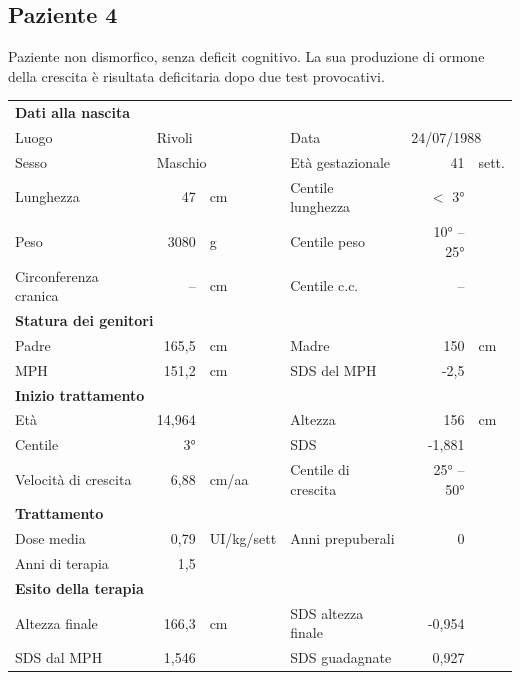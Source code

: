 \subsection*{Paziente 4}%

Paziente non dismorfico, senza deficit cognitivo. La sua produzione di ormone della crescita è risultata deficitaria dopo due test provocativi.

\begin{table}[!h]
\begin{tabular}{lrllrl}
\toprule
\multicolumn{6}{l}{\textbf{Dati alla nascita}}\\
Luogo 		& \multicolumn{2}{l}{Rivoli} 	& Data 					& \multicolumn{2}{l}{24/07/1988} 	\\
Sesso 		& \multicolumn{2}{l}{Maschio} 	& Età gestazionale 		& 41 		& sett.\\
Lunghezza 	& 47 		& cm 				& Centile lunghezza		& $<$ 3° 	\\
Peso 		& 3080 		& g					& Centile peso			& 10° -- 25° 	\\
Circonferenza cranica	& -- 		& cm 	& Centile c.c.			& -- \\
\midrule
\multicolumn{6}{l}{\textbf{Statura dei genitori}}\\
Padre 		& 165,5 & cm 	& Madre 				& 150 & cm \\
MPH 		& 151,2 & cm 	& SDS del MPH 			& -2,5\\
\midrule
\multicolumn{6}{l}{\textbf{Inizio trattamento}} \\
Età	& 14,964 & 		& Altezza 				& 156 & cm  \\
Centile & 3° 	 &		& SDS		& -1,881 \\
Velocità di crescita & 6,88 & cm/aa	& Centile di crescita & 25° -- 50°\\
\midrule
\multicolumn{6}{l}{\textbf{Trattamento}} \\
Dose media		& 0,79 & UI/kg/sett & Anni prepuberali & 0\\
Anni di terapia & 1,5\\
\midrule
\multicolumn{6}{l}{\textbf{Esito della terapia}} \\
Altezza finale			& 166,3 & cm 	& SDS altezza finale		& -0,954\\
SDS dal MPH				& 1,546 &		& SDS guadagnate 			& 0,927\\
\bottomrule
\end{tabular}
\end{table}
\clearpage

